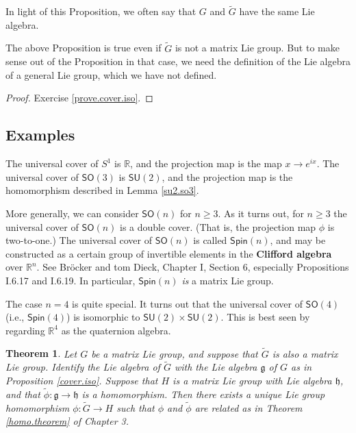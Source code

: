 \documentclass[12pt]{amsbook}
\let \frak = \mathfrak
\theoremstyle{plain}
\newtheorem{theorem}{Theorem}
\numberwithin{equation}{chapter}
\numberwithin{theorem}{chapter}
\begin{document}
In light of this Proposition, we often say that $G$ and $\widetilde{G}$ have
the same Lie algebra.

The above Proposition is true even if $\widetilde{G}$ is not a matrix Lie
group. But to make sense out of the Proposition in that case, we need the
definition of the Lie algebra of a general Lie group, which we have not defined.

\begin{proof}
Exercise \ref{prove.cover.iso}.
\end{proof}

\subsection{Examples}

The universal cover of $S^{1}$ is $\mathbb{R}$, and the projection map is the
map $x\rightarrow e^{ix}$. The universal cover of $\mathsf{SO}(3)$ is
$\mathsf{SU}(2)$, and the projection map is the homomorphism described in
Lemma \ref{su2.so3}.

More generally, we can consider $\mathsf{SO}(n)$ for $n\geq3$. As it turns
out, for $n\geq3$ the universal cover of $\mathsf{SO}(n)$ is a double cover.
(That is, the projection map $\phi$ is two-to-one.) The universal cover of
$\mathsf{SO}(n)$ is called $\mathsf{Spin}(n)$, and may be constructed as a
certain group of invertible elements in the \textbf{Clifford algebra} over
$\mathbb{R}^{n}$. See Br\"ocker and tom Dieck, Chapter I, Section 6,
especially Propositions I.6.17 and I.6.19. In particular, $\mathsf{Spin}(n)$
\textit{is} a matrix Lie group.

The case $n=4$ is quite special. It turns out that the universal cover of
$\mathsf{SO}(4)$ (i.e., $\mathsf{Spin}(4)$) is isomorphic to $\mathsf{SU}%
(2)\times\mathsf{SU}(2)$. This is best seen by regarding $\mathbb{R}^{4}$ as
the quaternion algebra.

\begin{theorem}
\label{cover.homo}Let $G$ be a matrix Lie group, and suppose that
$\widetilde{G}$ is also a matrix Lie group. Identify the Lie algebra of
$\widetilde{G}$ with the Lie algebra $\frak{g}$ of $G$ as in Proposition
\ref{cover.iso}. Suppose that $H$ is a matrix Lie group with Lie algebra
$\frak{h}$, and that $\widetilde{\phi}:\frak{g}\rightarrow\frak{h}$ is a
homomorphism. Then there exists a unique Lie group homomorphism $\phi
:\widetilde{G}\rightarrow H$ such that $\phi$ and $\widetilde{\phi}$ are
related as in Theorem \ref{homo.theorem} of Chapter 3.
\end{theorem}
\end{document}
